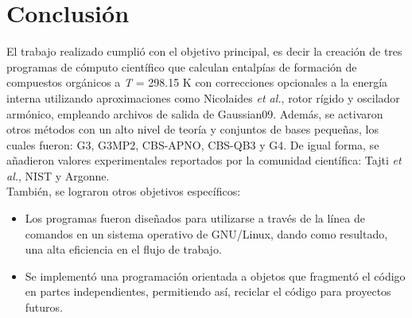 \chapter{Conclusión}

El trabajo realizado cumplió con el objetivo principal, es decir la creación de tres programas de cómputo científico que calculan entalpías de formación de compuestos orgánicos a \textit{T} = 298.15 K con correcciones opcionales a la energía interna utilizando aproximaciones como Nicolaides \textit{et al.}, rotor rígido y oscilador armónico, empleando archivos de salida de Gaussian09. Además, se activaron otros métodos con un alto nivel de teoría y conjuntos de bases pequeñas, los cuales fueron: G3, G3MP2, CBS-APNO, CBS-QB3 y G4. De igual forma, se añadieron valores experimentales reportados por la comunidad científica: Tajti \textit{et al.}, NIST y Argonne.\\

También, se lograron otros objetivos específicos:

\begin{itemize}
\item Los programas fueron diseñados para utilizarse a través de la línea de comandos en un sistema operativo de GNU/Linux, dando como resultado, una alta eficiencia en el flujo de trabajo.

\item Se implementó una programación orientada a objetos que fragmentó el código en partes independientes, permitiendo así, reciclar el código para proyectos futuros.
\end{itemize}





